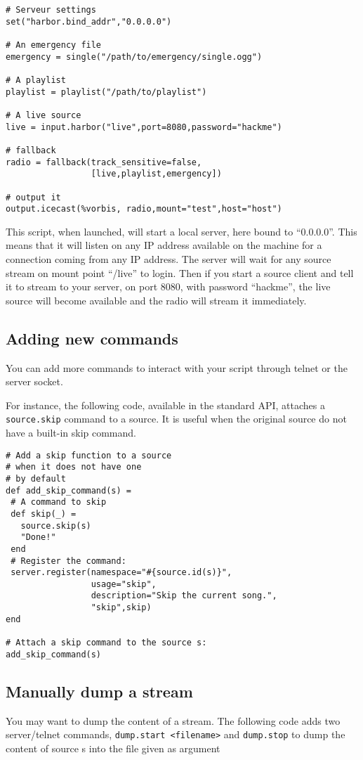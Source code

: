 \begin{verbatim}
# Serveur settings
set("harbor.bind_addr","0.0.0.0")

# An emergency file
emergency = single("/path/to/emergency/single.ogg")

# A playlist
playlist = playlist("/path/to/playlist")

# A live source
live = input.harbor("live",port=8080,password="hackme")

# fallback
radio = fallback(track_sensitive=false,
                 [live,playlist,emergency])

# output it
output.icecast(%vorbis, radio,mount="test",host="host")
\end{verbatim}
This script, when launched, will start a local server, here bound to ``0.0.0.0''. This means that it will listen on any IP address available on the machine for a connection coming from any IP address. The server will wait for any source stream on mount point ``/live'' to login.
Then if you start a source client and tell it to stream to your server, on port 8080, with password ``hackme'', the live source will become available and the radio will stream it immediately.

\subsection{Adding new commands}
You can add more commands to interact with your script through telnet or the server socket.

For instance, the following code, available in the standard API, attaches a \verb+source.skip+ command 
to a source. It is useful when the original source do not have a built-in skip command.

\begin{verbatim}
# Add a skip function to a source
# when it does not have one
# by default
def add_skip_command(s) =
 # A command to skip
 def skip(_) =
   source.skip(s)
   "Done!"
 end
 # Register the command:
 server.register(namespace="#{source.id(s)}",
                 usage="skip",
                 description="Skip the current song.",
                 "skip",skip)
end

# Attach a skip command to the source s:
add_skip_command(s)
\end{verbatim}
\subsection{Manually dump a stream}
You may want to dump the content of 
a stream. The following code adds 
two server/telnet commands, \verb+dump.start <filename>+
and \verb+dump.stop+ to dump the content of source s
into the file given as argument

